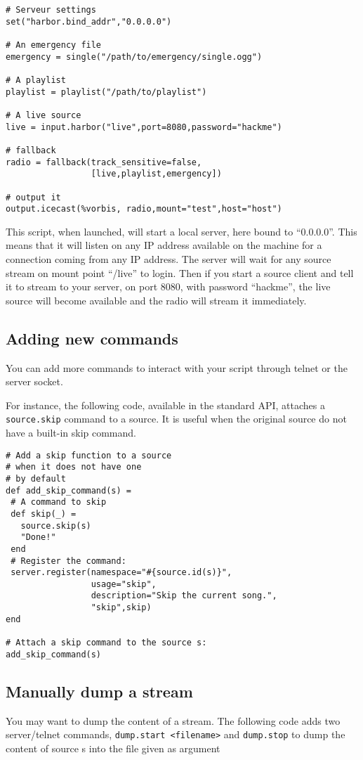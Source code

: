 \begin{verbatim}
# Serveur settings
set("harbor.bind_addr","0.0.0.0")

# An emergency file
emergency = single("/path/to/emergency/single.ogg")

# A playlist
playlist = playlist("/path/to/playlist")

# A live source
live = input.harbor("live",port=8080,password="hackme")

# fallback
radio = fallback(track_sensitive=false,
                 [live,playlist,emergency])

# output it
output.icecast(%vorbis, radio,mount="test",host="host")
\end{verbatim}
This script, when launched, will start a local server, here bound to ``0.0.0.0''. This means that it will listen on any IP address available on the machine for a connection coming from any IP address. The server will wait for any source stream on mount point ``/live'' to login.
Then if you start a source client and tell it to stream to your server, on port 8080, with password ``hackme'', the live source will become available and the radio will stream it immediately.

\subsection{Adding new commands}
You can add more commands to interact with your script through telnet or the server socket.

For instance, the following code, available in the standard API, attaches a \verb+source.skip+ command 
to a source. It is useful when the original source do not have a built-in skip command.

\begin{verbatim}
# Add a skip function to a source
# when it does not have one
# by default
def add_skip_command(s) =
 # A command to skip
 def skip(_) =
   source.skip(s)
   "Done!"
 end
 # Register the command:
 server.register(namespace="#{source.id(s)}",
                 usage="skip",
                 description="Skip the current song.",
                 "skip",skip)
end

# Attach a skip command to the source s:
add_skip_command(s)
\end{verbatim}
\subsection{Manually dump a stream}
You may want to dump the content of 
a stream. The following code adds 
two server/telnet commands, \verb+dump.start <filename>+
and \verb+dump.stop+ to dump the content of source s
into the file given as argument

